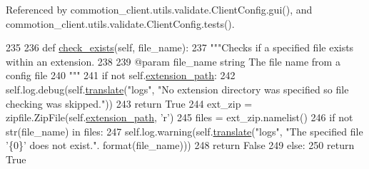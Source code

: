 Referenced by commotion\+\_\+client.\+utils.\+validate.\+Client\+Config.\+gui(), and commotion\+\_\+client.\+utils.\+validate.\+Client\+Config.\+tests().


\begin{DoxyCode}
235 
236     \textcolor{keyword}{def }\hyperlink{classcommotion__client_1_1utils_1_1validate_1_1ClientConfig_a8dbef5da5fb270a8842b3eed36bc595e}{check\_exists}(self, file\_name):
237         \textcolor{stringliteral}{"""Checks if a specified file exists within an extension.}
238 \textcolor{stringliteral}{}
239 \textcolor{stringliteral}{        @param file\_name string The file name from a config file}
240 \textcolor{stringliteral}{        """}
241         \textcolor{keywordflow}{if} \textcolor{keywordflow}{not} self.\hyperlink{classcommotion__client_1_1utils_1_1validate_1_1ClientConfig_a422e4fea49a7e582749c0e0c6d11e2d9}{extension\_path}:
242             self.log.debug(self.\hyperlink{classcommotion__client_1_1utils_1_1validate_1_1ClientConfig_a12d19377a853ce92cc0e0d758acdd804}{translate}(\textcolor{stringliteral}{"logs"}, \textcolor{stringliteral}{"No extension directory was specified so file
       checking was skipped."}))
243             \textcolor{keywordflow}{return} \textcolor{keyword}{True}
244         ext\_zip = zipfile.ZipFile(self.\hyperlink{classcommotion__client_1_1utils_1_1validate_1_1ClientConfig_a422e4fea49a7e582749c0e0c6d11e2d9}{extension\_path}, \textcolor{stringliteral}{'}\textcolor{stringliteral}{r')}
245 \textcolor{stringliteral}{        files = ext\_zip.namelist()}
246 \textcolor{stringliteral}{        }\textcolor{keywordflow}{if} \textcolor{keywordflow}{not} str(file\_name) \textcolor{keywordflow}{in} files:
247             self.log.warning(self.\hyperlink{classcommotion__client_1_1utils_1_1validate_1_1ClientConfig_a12d19377a853ce92cc0e0d758acdd804}{translate}(\textcolor{stringliteral}{"logs"}, \textcolor{stringliteral}{"The specified file '\{0\}' does not exist."}.
      format(file\_name)))
248             \textcolor{keywordflow}{return} \textcolor{keyword}{False}
249         \textcolor{keywordflow}{else}:
250             \textcolor{keywordflow}{return} \textcolor{keyword}{True}
            
\end{DoxyCode}

